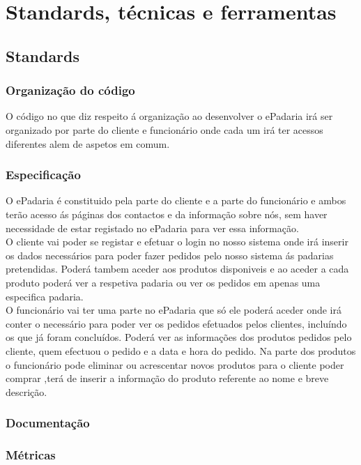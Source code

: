 \chapter{Standards, técnicas e ferramentas}
\label{standards_tecnicas_ferramentas}

\section{Standards}
\subsection{Organização do código}
O código no que diz respeito á organização ao desenvolver o ePadaria irá ser organizado por parte do cliente e funcionário onde cada um irá ter acessos diferentes alem de aspetos em comum.
\subsection{Especificação}
O ePadaria é constituido pela parte do cliente e a parte do funcionário e ambos terão acesso ás páginas dos contactos e da informação sobre nós, sem haver necessidade de estar registado no ePadaria para ver essa informação.\\
O cliente vai poder se registar e efetuar o login no nosso sistema onde irá inserir os dados necessários para poder fazer pedidos pelo nosso sistema ás padarias pretendidas. Poderá tambem aceder aos produtos disponiveis e ao aceder a cada produto poderá ver a respetiva padaria ou ver os pedidos em apenas uma especifica padaria. \\
O funcionário vai ter uma parte no ePadaria que só ele poderá aceder onde irá conter o necessário para poder ver os pedidos efetuados pelos clientes, incluíndo os que já foram concluídos. Poderá ver as informações dos produtos pedidos pelo cliente, quem efectuou o pedido e a data e hora do pedido. Na parte dos produtos o funcionário pode eliminar ou acrescentar novos produtos para o cliente poder comprar ,terá de inserir a informação do produto referente ao nome e breve descrição.

\subsection{Documentação}
\subsection{Métricas}


